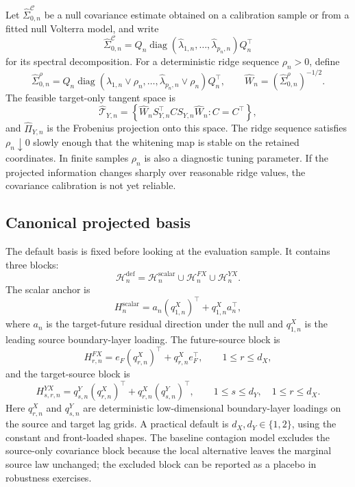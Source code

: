 \documentclass[11pt,a4paper]{amsart}
\theoremstyle{plain}
\theoremstyle{definition}
\theoremstyle{remark}
\DeclareMathOperator{\diag}{diag}
\newcommand{\scrT}{\mathcal{T}}
\begin{document}
Let \(\widehat\Sigma_{0,n}^{\mathcal C}\) be a null covariance estimate obtained on a calibration
sample or from a fitted null Volterra model, and write
\[
        \widehat\Sigma_{0,n}^{\mathcal C}
        =
        Q_n\diag(\widehat\lambda_{1,n},\dots,\widehat\lambda_{p_n,n})Q_n^\top
\]
for its spectral decomposition.  For a deterministic ridge sequence \(\rho_n>0\), define
\[
        \widehat\Sigma_{0,n}^{\rho}
        =
        Q_n
        \diag(\widehat\lambda_{1,n}\vee\rho_n,\dots,\widehat\lambda_{p_n,n}\vee\rho_n)
        Q_n^\top,
        \qquad
        \widehat W_n=(\widehat\Sigma_{0,n}^{\rho})^{-1/2}.
\]
The feasible target-only tangent space is
\[
        \widehat{\scrT}_{Y,n}
        =
        \left\{
        \widehat W_nS_{Y,n}^\top C S_{Y,n}\widehat W_n
        :
        C=C^\top
        \right\},
\]
and \(\widehat\Pi_{Y,n}\) is the Frobenius projection onto this space.  The ridge sequence
satisfies \(\rho_n\downarrow0\) slowly enough that the whitening map is stable on the retained
coordinates.  In finite samples \(\rho_n\) is also a diagnostic tuning parameter.  If the projected
information changes sharply over reasonable ridge values, the covariance calibration is not yet
reliable.

\subsection{Canonical projected basis}

The default basis is fixed before looking at the evaluation sample.  It contains three blocks:
\[
        \mathcal H_n^{\mathrm{def}}
        =
        \mathcal H_n^{\mathrm{scalar}}
        \cup
        \mathcal H_n^{FX}
        \cup
        \mathcal H_n^{YX}.
\]
The scalar anchor is
\[
        H_n^{\mathrm{scalar}}
        =
        a_n(q_{1,n}^{X})^\top+q_{1,n}^{X}a_n^\top,
\]
where \(a_n\) is the target-future residual direction under the null and \(q_{1,n}^{X}\) is the
leading source boundary-layer loading.  The future-source block is
\[
        H_{r,n}^{FX}
        =
        e_F(q_{r,n}^{X})^\top+q_{r,n}^{X}e_F^\top,
        \qquad
        1\le r\le d_X,
\]
and the target-source block is
\[
        H_{s,r,n}^{YX}
        =
        q_{s,n}^{Y}(q_{r,n}^{X})^\top+q_{r,n}^{X}(q_{s,n}^{Y})^\top,
        \qquad
        1\le s\le d_Y,
        \quad
        1\le r\le d_X.
\]
Here \(q_{r,n}^{X}\) and \(q_{s,n}^{Y}\) are deterministic low-dimensional boundary-layer loadings
on the source and target lag grids.  A practical default is \(d_X,d_Y\in\{1,2\}\), using the
constant and front-loaded shapes.  The baseline contagion model excludes the source-only covariance
block because the local alternative leaves the marginal source law unchanged; the excluded block can
be reported as a placebo in robustness exercises.
\end{document}
